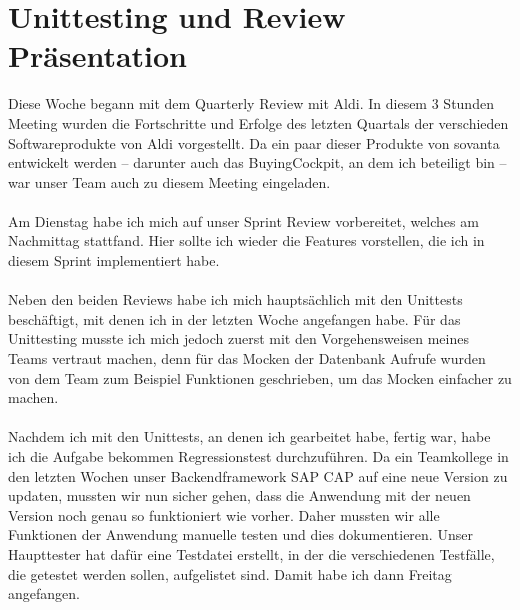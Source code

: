\section{Unittesting und Review Präsentation}
Diese Woche begann mit dem Quarterly Review mit Aldi. In diesem 3 Stunden Meeting wurden die Fortschritte und Erfolge des letzten Quartals der verschieden Softwareprodukte von Aldi vorgestellt. Da ein paar dieser Produkte von sovanta entwickelt werden – darunter auch das BuyingCockpit, an dem ich beteiligt bin – war unser Team auch zu diesem Meeting eingeladen. \\\\
Am Dienstag habe ich mich auf unser Sprint Review vorbereitet, welches am Nachmittag stattfand. Hier sollte ich wieder die Features vorstellen, die ich in diesem Sprint implementiert habe. \\\\
Neben den beiden Reviews habe ich mich hauptsächlich mit den Unittests beschäftigt, mit denen ich in der letzten Woche angefangen habe. Für das Unittesting musste ich mich jedoch zuerst mit den Vorgehensweisen meines Teams vertraut machen, denn für das Mocken der Datenbank Aufrufe wurden von dem Team zum Beispiel Funktionen geschrieben, um das Mocken einfacher zu machen. \\\\
Nachdem ich mit den Unittests, an denen ich gearbeitet habe, fertig war, habe ich die Aufgabe bekommen Regressionstest durchzuführen. Da ein Teamkollege in den letzten Wochen unser Backendframework SAP CAP auf eine neue Version zu updaten, mussten wir nun sicher gehen, dass die Anwendung mit der neuen Version noch genau so funktioniert wie vorher. Daher mussten wir alle Funktionen der Anwendung manuelle testen und dies dokumentieren. Unser Haupttester hat dafür eine Testdatei erstellt, in der die verschiedenen Testfälle, die getestet werden sollen, aufgelistet sind. Damit habe ich dann Freitag angefangen. \\\\

